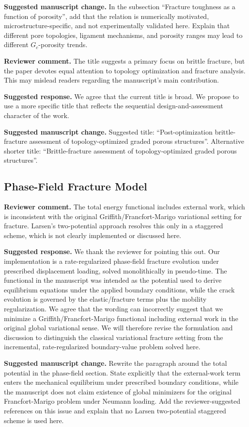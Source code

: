 \documentclass[11pt,a4paper]{article}
\newcommand{\comment}[1]{\par\noindent\textbf{Reviewer comment.} #1\par}
\newcommand{\response}[1]{\par\noindent\textbf{Suggested response.} #1\par}
\newcommand{\change}[1]{\par\noindent\textbf{Suggested manuscript change.} #1\par}
\begin{document}
\change{In the subsection ``Fracture toughness as a function of porosity'', add
that the relation is numerically motivated, microstructure-specific, and not
experimentally validated here. Explain that different pore topologies, ligament
mechanisms, and porosity ranges may lead to different \(G_c\)-porosity trends.}

\comment{The title suggests a primary focus on brittle fracture, but the paper
devotes equal attention to topology optimization and fracture analysis. This may
mislead readers regarding the manuscript's main contribution.}

\response{We agree that the current title is broad. We propose to use a more
specific title that reflects the sequential design-and-assessment character of
the work.}

\change{Suggested title: ``Post-optimization brittle-fracture assessment of
topology-optimized graded porous structures''. Alternative shorter title:
``Brittle-fracture assessment of topology-optimized graded porous structures''.}

\subsection*{Phase-Field Fracture Model}

\comment{The total energy functional includes external work, which is
inconsistent with the original Griffith/Francfort-Marigo variational setting
for fracture. Larsen's two-potential approach resolves this only in a staggered
scheme, which is not clearly implemented or discussed here.}

\response{We thank the reviewer for pointing this out. Our implementation is a
rate-regularized phase-field fracture evolution under prescribed displacement
loading, solved monolithically in pseudo-time. The functional in the manuscript
was intended as the potential used to derive equilibrium equations under the
applied boundary conditions, while the crack evolution is governed by the
elastic/fracture terms plus the mobility regularization. We agree that the
wording can incorrectly suggest that we minimize a Griffith/Francfort-Marigo
functional including external work in the original global variational sense.
We will therefore revise the formulation and discussion to distinguish the
classical variational fracture setting from the incremental, rate-regularized
boundary-value problem solved here.}

\change{Rewrite the paragraph around the total potential in the phase-field
section. State explicitly that the external-work term enters the mechanical
equilibrium under prescribed boundary conditions, while the manuscript does not
claim existence of global minimizers for the original Francfort-Marigo problem
under Neumann loading. Add the reviewer-suggested references on this issue and
explain that no Larsen two-potential staggered scheme is used here.}
\end{document}
